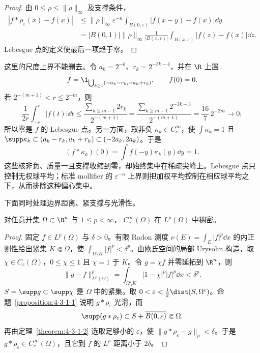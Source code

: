 \begin{proof}
由 $0\leq\rho\leq\|\rho\|_\infty$ 及支撑条件，
\begin{align*}
 |f*\rho_\varepsilon(x)-f(x)|
 &\leq \|\rho\|_\infty\varepsilon^{-n}
       \int_{B(0,\varepsilon)}|f(x-y)-f(x)|\dd y\\
 &=|B(0,1)|\|\rho\|_\infty
   \frac1{|B(x,\varepsilon)|}\int_{B(x,\varepsilon)}|f(z)-f(x)|\dd z.
\end{align*}
Lebesgue 点的定义使最后一项趋于零。
\end{proof}

这里的尺度上界不能删去。令 $a_k=2^{-k}$、$r_k=2^{-3k-4}$，并在 $\R$ 上置
\[
 f=\1_{\bigcup_{k\geq1}(-a_k-r_k,-a_k+r_k)},\qquad f(0)=0.
\]
若 $2^{-(m+1)}<r\leq2^{-m}$，则
\[
 \frac1{2r}\int_{-r}^{r}|f(t)|\dd t
 \leq \frac{\sum_{k\geq m-1}2r_k}{2^{-(m+1)}}
 =\frac{\sum_{k\ge m-1}2^{-3k-3}}{2^{-(m+1)}}
 =\frac{16}{7}\,2^{-2m}\longrightarrow0;
\]
所以零是 $f$ 的 Lebesgue 点。另一方面，取非负 $\kappa_k\in C_c^\infty$，使
$\int\kappa_k=1$ 且
$\supp\kappa_k\subset(a_k-r_k,a_k+r_k)\subset(-2a_k,2a_k)$。于是
\[
 (f*\kappa_k)(0)=\int f(-y)\kappa_k(y)\dd y=1.
\]
这些核非负、质量一且支撑收缩到零，却始终集中在稀疏尖峰上。Lebesgue 点只控制无权球平均；标准
mollifier 的 $\varepsilon^{-n}$ 上界则把加权平均控制在相应球平均之下，从而排除这种偏心集中。

下面同时处理边界距离、紧支撑与光滑性。

\begin{theorem}[光滑紧支撑函数的稠密性]\label{theorem:4-3-1-3}
对任意开集 $\Omega\subset\R^n$ 与 $1\leq p<\infty$，
$C_c^\infty(\Omega)$ 在 $L^p(\Omega)$ 中稠密。
\end{theorem}

\begin{proof}
固定 $f\in L^p(\Omega)$ 与 $\delta>0$。有限 Radon 测度
$\nu(E)=\int_E|f|^p\dd x$ 的内正则性给出紧集 $K\Subset\Omega$，使
$\int_{\Omega\setminus K}|f|^p<\delta^p$。由欧氏空间的局部 Urysohn 构造，取
$\chi\in C_c(\Omega)$，$0\leq\chi\leq1$ 且 $\chi=1$ 于 $K$。令 $g=\chi f$ 并零延拓到
$\R^n$，则
\[
 \|g-f\|_{L^p(\Omega)}^p
 =\int_{\Omega\setminus K}|1-\chi|^p|f|^p\dd x<\delta^p.
\]
$S=\supp g\subset\supp\chi$ 是 $\Omega$ 中的紧集。取
$0<\varepsilon<\tfrac12\dist(S,\Omega^c)$。命题~\ref{proposition:4-3-1-1} 说明
$g*\rho_\varepsilon$ 光滑，而
\[
 \supp(g*\rho_\varepsilon)
 \subset S+\overline{B(0,\varepsilon)}\Subset\Omega.
\]
再由定理~\ref{theorem:4-3-1-2} 选取足够小的 $\varepsilon$，使
$\|g*\rho_\varepsilon-g\|_p<\delta$。于是
$g*\rho_\varepsilon\in C_c^\infty(\Omega)$，且它到 $f$ 的 $L^p$ 距离小于 $2\delta$。
\end{proof}


